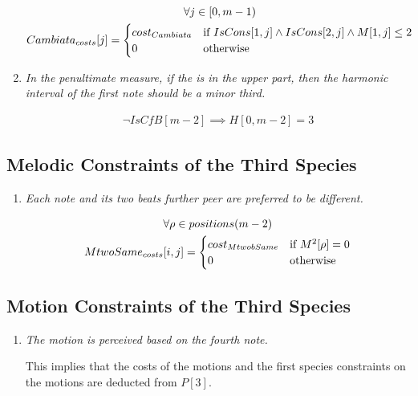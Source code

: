 \begin{enumerate}[wide, label=\bfseries 3.H\arabic*]
\begin{equation}
    \begin{gathered}
        \forall j \in [0, m-1)\\
        Cambiata_{costs}[j] = \begin{cases}
            cost_{Cambiata} & \text{if } IsCons[1, j] \land IsCons[2, j] \land M[1, j] \leq 2\\
            0 & \text{otherwise}
        \end{cases}
    \end{gathered}
\end{equation}

\item\label{rule:penult3sp} {\textit{In the penultimate measure, if the \cfs is in the upper part, then the harmonic interval of the first note should be a minor third.}}

\begin{equation}
    \begin{gathered}
        \lnot IsCfB[m-2] \implies H[0, m-2] = 3
    \end{gathered}
\end{equation}
\end{enumerate}
\subsection*{Melodic Constraints of the Third Species}
\begin{enumerate}[wide, label=\bfseries 3.M\arabic*]
  \item\label{rule:twobeats} {\textit{Each note and its two beats further peer are preferred to be different.}}


\begin{equation}
    \begin{gathered}
        \forall \rho \in positions(m-2) \\
        MtwoSame_{costs}[i, j] = \begin{cases}
            cost_{MtwobSame} & \text{if } M^2[\rho] = 0\\
            0 & \text{otherwise}
        \end{cases}
    \end{gathered}
\end{equation}
\end{enumerate}
\subsection*{Motion Constraints of the Third Species}
\begin{enumerate}[wide, label=\bfseries 3.P\arabic*]
  \item\label{rule:motion3rd} {\textit{The motion is perceived based on the fourth note.}}

This implies that the costs of the motions and the first species constraints on the motions are deducted from $P[3]$.
\end{enumerate}


